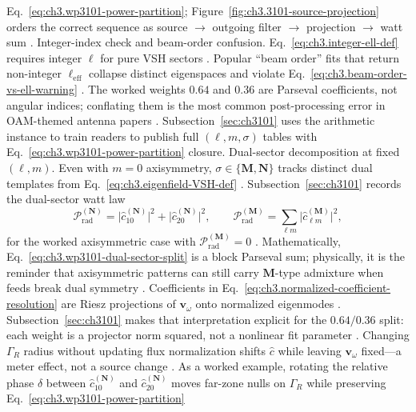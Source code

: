 Eq.~\eqref{eq:ch3.wp3101-power-partition}; Figure~\ref{fig:ch3.3101-source-projection} orders the correct sequence as source \(\to\) outgoing
filter \(\to\) projection \(\to\) watt sum \cite{harrington2001}.
Integer-index check and beam-order confusion. Eq.~\eqref{eq:ch3.integer-ell-def} requires integer \(\ell\) for pure VSH sectors \cite{hansen1988}. Popular ``beam order''
fits that return non-integer \(\ell_{\mathrm{eff}}\) collapse distinct eigenspaces and violate Eq.~\eqref{eq:ch3.beam-order-vs-ell-warning}
\cite{stratton1941}. The worked weights \(0.64\) and \(0.36\) are Parseval coefficients, not angular indices; conflating them
is the most common post-processing error in OAM-themed antenna papers \cite{allen1992}. Subsection~\ref{sec:ch3101}
uses the arithmetic instance to train readers to publish full \((\ell,m,\sigma)\) tables with Eq.~\eqref{eq:ch3.wp3101-power-partition} closure.
Dual-sector decomposition at fixed $(\ell,m)$. Even with \(m=0\) axisymmetry, \(\sigma\in\{\mathbf{M},\mathbf{N}\}\) tracks distinct dual templates from Eq.~\eqref{eq:ch3.eigenfield-VSH-def}
\cite{belinfante1940}. Subsection~\ref{sec:ch3101} records the dual-sector watt law
\begin{equation}
\label{eq:ch3.wp3101-dual-sector-split}
\mathcal{P}_{\mathrm{rad}}^{(\mathbf{N})}
=
\bigl|\widehat{c}_{10}^{(\mathbf{N})}\bigr|^{2}
+
\bigl|\widehat{c}_{20}^{(\mathbf{N})}\bigr|^{2},
\qquad
\mathcal{P}_{\mathrm{rad}}^{(\mathbf{M})}
=
\sum_{\ell m}\bigl|\widehat{c}_{\ell m}^{(\mathbf{M})}\bigr|^{2},
\end{equation}
for the worked axisymmetric case with \(\mathcal{P}_{\mathrm{rad}}^{(\mathbf{M})}=0\) \cite{poynting1884}. Mathematically, Eq.~\eqref{eq:ch3.wp3101-dual-sector-split} is a block Parseval sum; physically, it is the reminder that axisymmetric patterns can still carry \(\mathbf{M}\)-type admixture when feeds break dual symmetry
\cite{belinfante1940}.
Coefficients in Eq.~\eqref{eq:ch3.normalized-coefficient-resolution} are Riesz projections of \(\mathbf{v}_\omega\) onto normalized eigenmodes
\cite{kato1995}. Subsection~\ref{sec:ch3101} makes that interpretation explicit for the \(0.64/0.36\) split: each weight is a projector norm squared, not a nonlinear fit parameter
\cite{harrington2001}. Changing \(\Gamma_R\) radius without updating flux normalization shifts \(\widehat{c}\) while leaving \(\mathbf{v}_\omega\) fixed---a meter effect, not a source change
\cite{stratton1941}.
As a worked example, rotating the relative phase \(\delta\) between \(\widehat{c}_{10}^{(\mathbf{N})}\) and \(\widehat{c}_{20}^{(\mathbf{N})}\) moves far-zone nulls on \(\Gamma_R\) while preserving Eq.~\eqref{eq:ch3.wp3101-power-partition}
